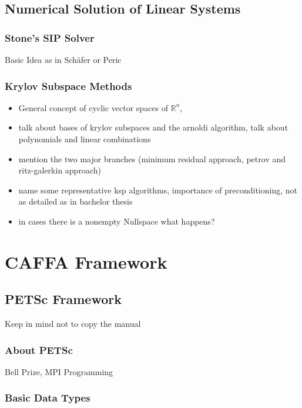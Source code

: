 \documentclass[article,type=msc,colorback,accentcolor=tud2a]{tudthesis}
\begin{document}
    \subsection{Numerical Solution of Linear Systems}

        \subsubsection{Stone's SIP Solver}

          Basic Idea as in Schäfer or Peric

        \subsubsection{Krylov Subspace Methods}

          \begin{itemize}
            \item General concept of cyclic vector spaces of \(\mathbb{R}^n\), 
            \item talk about bases of krylov subspaces and the arnoldi algorithm, talk about polynomials and linear combinations
            \item mention the two major branches (minimum residual approach, petrov and ritz-galerkin approach) 
            \item name some representative ksp algorithms, importance of preconditioning, not as detailed as in bachelor thesis
            \item in cases there is a nonempty Nullspace what happens?
          \end{itemize}

  \section{CAFFA Framework}

    \subsection{PETSc Framework}
        Keep in mind not to copy the manual
      \subsubsection{About PETSc}

        Bell Prize, MPI Programming

      \subsubsection{Basic Data Types}
\end{document}
